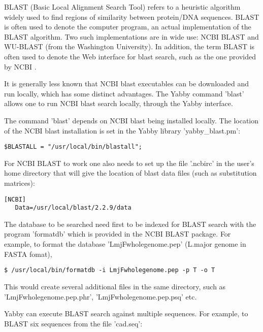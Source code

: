 BLAST (Basic Local Alignment Search Tool) refers to a heuristic
algorithm widely used to find regions of similarity between
protein/DNA sequences. BLAST is often used to denote the computer
program, an actual implementation of the BLAST algorithm. Two
such implementations are in wide use: NCBI BLAST and WU-BLAST
(from the Washington University). In addition, the term BLAST
is often used to denote the Web interface for blast search,
such as the one provided by NCBI \cite{wwwblast}.

It is generally less known that NCBI blast executables can be
downloaded \cite{ftpblast} and run locally, which has some
distinct advantages. The Yabby command 'blast' allows one to
run NCBI blast search locally, through the Yabby interface. 

The command 'blast' depends on NCBI blast being installed locally.
The location of the NCBI blast installation is set in the
Yabby library 'yabby\_blast.pm':

\begin{verbatim}
$BLASTALL = "/usr/local/bin/blastall";
\end{verbatim}

For NCBI BLAST to work one also needs to set up the file
'.ncbirc' in the user's home directory that will give the
location of blast data files (such as substitution matrices): 

\begin{verbatim}
[NCBI]
   Data=/usr/local/blast/2.2.9/data
\end{verbatim}

The database to be searched need first to be indexed for BLAST
search with the program 'formatdb' which is provided in the
NCBI BLAST package.  For example, to format the database
'LmjFwholegenome.pep' (L.major genome in FASTA fomat),

\begin{verbatim}
$ /usr/local/bin/formatdb -i LmjFwholegenome.pep -p T -o T
\end{verbatim}

This would create several additional files in the same directory,
such as 'LmjFwholegenome.pep.phr', 'LmjFwholegenome.pep.psq' etc.

Yabby can execute BLAST search against multiple sequences. For
example, to BLAST six sequences from the file 'cad.seq':

